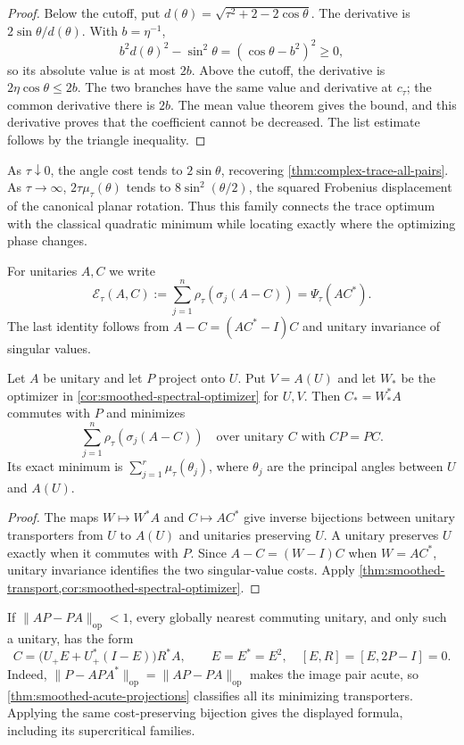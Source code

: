 \begin{proof}
Below the cutoff, put $d(\theta)=\sqrt{\tau^2+2-2\cos\theta}$.
The derivative is $2\sin\theta/d(\theta)$. With $b=\eta^{-1}$,
\[
 b^2d(\theta)^2-\sin^2\theta=(\cos\theta-b^2)^2\geq0,
\]
so its absolute value is at most $2b$. Above the cutoff, the derivative
is $2\eta\cos\theta\leq2b$. The two branches have the same value
and derivative at $c_\tau$; the common derivative there is $2b$.
The mean value theorem gives the bound, and this derivative proves that
the coefficient cannot be decreased. The list estimate follows by the
triangle inequality.
\end{proof}

As $\tau\downarrow0$, the angle cost tends to $2\sin\theta$, recovering
\cref{thm:complex-trace-all-pairs}. As $\tau\to\infty$,
$2\tau\mu_\tau(\theta)$ tends to $8\sin^2(\theta/2)$, the squared
Frobenius displacement of the canonical planar rotation. Thus this family
connects the trace optimum with the classical quadratic minimum while
locating exactly where the optimizing phase changes.

For unitaries $A,C$ we write
\[
 \mathcal E_\tau(A,C)
  :=\sum_{j=1}^n\rho_\tau(\sigma_j(A-C))
  =\Psi_\tau(AC^*).
\]
The last identity follows from $A-C=(AC^*-I)C$ and unitary
invariance of singular values.

\begin{corollary}
\label{cor:smoothed-commuting-correction}
Let $A$ be unitary and let $P$ project onto $U$. Put $V=A(U)$ and
let $W_*$ be the optimizer in \cref{cor:smoothed-spectral-optimizer}
for $U,V$. Then $C_*=W_*^*A$ commutes with $P$ and minimizes
\[
 \sum_{j=1}^n \rho_\tau(\sigma_j(A-C))
 \quad\text{over unitary }C\text{ with }CP=PC.
\]
Its exact minimum is $\sum_{j=1}^r\mu_\tau(\theta_j)$, where
$\theta_j$ are the principal angles between $U$ and $A(U)$.
\end{corollary}

\begin{proof}
The maps $W\mapsto W^*A$ and $C\mapsto AC^*$ give inverse
bijections between unitary transporters from $U$ to $A(U)$ and
unitaries preserving $U$. A unitary preserves $U$ exactly when it
commutes with $P$. Since $A-C=(W-I)C$ when $W=AC^*$, unitary
invariance identifies the two singular-value costs. Apply
\cref{thm:smoothed-transport,cor:smoothed-spectral-optimizer}.
\end{proof}

If $\|AP-PA\|_{\mathrm{op}}<1$, every globally nearest commuting
unitary, and only such a unitary, has the form
\[
 C=\bigl(U_+E+U_+^*(I-E)\bigr)R^*A,
 \qquad E=E^*=E^2,\quad [E,R]=[E,2P-I]=0.
\]
Indeed, $\|P-APA^*\|_{\mathrm{op}}=\|AP-PA\|_{\mathrm{op}}$ makes
the image pair acute, so \cref{thm:smoothed-acute-projections} classifies
all its minimizing transporters. Applying the same cost-preserving
bijection gives the displayed formula, including its supercritical
families.

